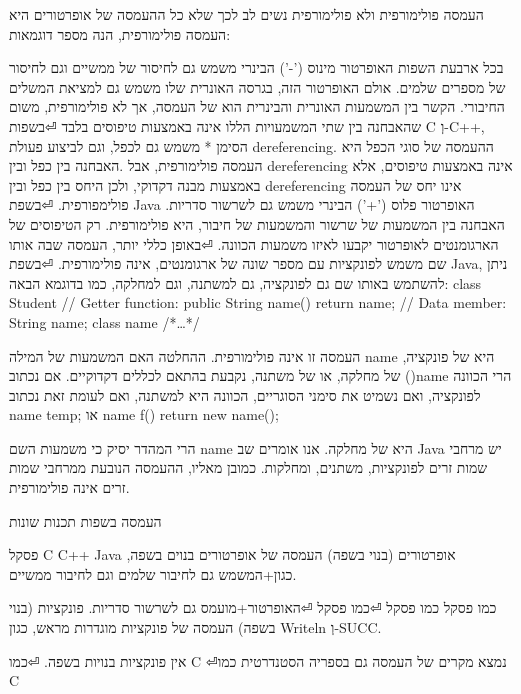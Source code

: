       העמסה פולימורפית ולא פולימורפית
      נשים לב לכך שלא כל ההעמסה של אופרטורים היא העמסה פולימורפית, הנה מספר דוגמאות:
      \begin{ציינון}
\item בכל ארבעת השפות האופרטור מינוס ('-') הבינרי משמש גם לחיסור של ממשיים וגם לחיסור של מספרים שלמים. אולם האופרטור הזה, בגרסה האונרית שלו משמש גם למציאת המשלים החיבורי. הקשר בין המשמעות האונרית והבינרית הוא של העמסה, אך לא פולימורפית, משום שהאבחנה בין שתי המשמעויות הללו אינה באמצעות טיפוסים בלבד
⏎בשפות C וְ-C++, הסימן * משמש גם לכפל, וגם לביצוע פעולת dereferencing. ההעמסה של סוגי הכפל היא העמסה פולימורפית, אבל .האבחנה בין כפל ובין dereferencing אינה באמצעות טיפוסים, אלא באמצעות מבנה דקדוקי, ולכן היחס בין כפל ובין dereferencing אינו יחס של העמסה פולימפורפית.
⏎בשפת Java האופרטור פלוס ('+') הבינרי משמש גם לשרשור סדריות. האבחנה בין המשמעות של שרשור והמשמעות של חיבור, היא פולימורפית. רק הטיפוסים של הארגומנטים לאופרטור יקבעו לאיזו משמעות הכוונה.
⏎באופן כללי יותר, העמסה שבה אותו שם משמש לפונקציות עם מספר שונה של ארגומנטים, אינה פולימורפית.
⏎בשפת Java, ניתן להשתמש באותו שם גם לפונקציה, גם למשתנה, וגם למחלקה, כמו בדוגמא הבאה:
      class Student {
        // Getter function:
        public String name() { return name; }
        // Data member:
        String name;
        class name { /*…*/ }
      }
  \end{ציינון}

      העמסה זו אינה פולימורפית. ההחלטה האם המשמעות של המילה name היא של פונקציה, של מחלקה, או של משתנה, נקבעת בהתאם לכללים דקדוקיים. אם נכתוב ()name הרי הכוונה לפונקציה, ואם נשמיט את סימני הסוגריים, הכוונה היא למשתנה, ואם לעומת זאת נכתוב
      name temp;
      או
      name f() { return new name(); }

      הרי המהדר יסיק כי משמעות השם name היא של מחלקה. אנו אומרים שב Java יש מרחבי שמות זרים לפונקציות, משתנים, ומחלקות. כמובן מאליו, ההעמסה הנובעת ממרחבי שמות זרים אינה פולימורפית.

      העמסה בשפות תכנות שונות

      פסקל
      C
      C++
      Java
      אופרטורים
      (בנוי בשפה)
      העמסה של אופרטורים בנוים בשפה, כגון+המשמש גם לחיבור שלמים וגם לחיבור ממשיים.

      כמו פסקל
      כמו פסקל
⏎כמו פסקל
⏎האופרטור+מועמס גם לשרשור סדריות.
      פונקציות (בנוי בשפה)
      העמסה של פונקציות מוגדרות מראש, כגון Writeln וְ-SUCC.

      אין פונקציות בנויות בשפה.
⏎כמו C
⏎נמצא מקרים של העמסה גם בספריה הסטנדרטית
      כמו C

